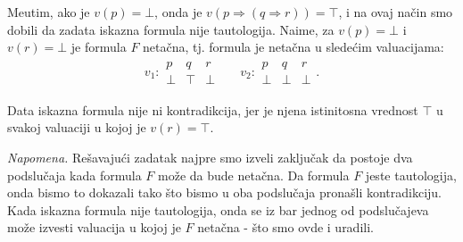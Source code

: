 \begin{enumerate}[(a)]
Me\dj utim, ako je $v(p)=\bot$, onda je $v(p\Rightarrow(q\Rightarrow r))=\top$, i na ovaj na\v cin smo dobili da zadata iskazna formula nije tautologija. Naime, za $v(p)=\bot$ i $v(r)=\bot$ je formula $F$ neta\v cna, tj. formula je neta\v cna u slede\' cim valuacijama:
\begin{align*}
v_1:\begin{array}{ccc}
p & q & r \\
\hline
\bot & \top & \bot
\end{array}&&
v_2:\begin{array}{ccc}
p & q & r \\
\hline
\bot & \bot & \bot
\end{array}.
\end{align*}

Data iskazna formula nije ni kontradikcija, jer je njena istinitosna vrednost $\top$ u svakoj valuaciji u kojoj je $v(r)=\top$.

{\it Napomena.} Re\v savaju\' ci zadatak najpre smo izveli zaklju\v cak da postoje dva podslu\v caja kada formula $F$ mo\v ze da bude neta\v cna. Da formula $F$ jeste tautologija, onda bismo to dokazali tako \v sto bismo u oba podslu\v caja prona\v sli kontradikciju. Kada iskazna formula nije tautologija, onda se iz bar jednog od podslu\v cajeva mo\v ze izvesti valuacija u kojoj je $F$ neta\v cna - \v sto smo ovde i uradili.



\end{enumerate}

